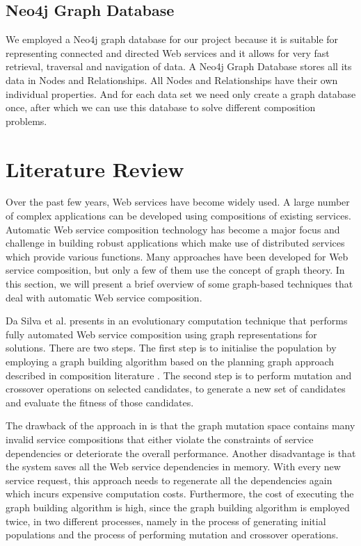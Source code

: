 \subsection{Neo4j Graph Database}
We employed a Neo4j \cite{6} graph database for our project because it is suitable for representing connected and directed Web services and it allows for very fast retrieval, traversal and navigation of data. A Neo4j Graph Database stores all its data in Nodes and Relationships. All Nodes and Relationships have their own individual properties. And for each data set we need only create a graph database once, after which we can use this database to solve different composition problems. \par

\section{Literature Review}
Over the past few years, Web services have become widely used. A large number of complex applications can be developed using compositions of existing services. Automatic Web service composition technology has become a major focus and challenge in building robust applications which make use of distributed services which provide various functions. Many approaches have been developed for Web service composition, but only a few of them use the concept of graph theory. In this section, we will present a brief overview of some graph-based techniques that deal with automatic Web service composition.\par
Da Silva et al. presents in \cite{2} an evolutionary computation technique that performs fully automated Web service composition using graph representations for solutions. There are two steps. The first step is to initialise the population by employing a graph building algorithm based on the planning graph approach described in composition literature \cite{3}. The second step is to perform mutation and crossover operations on selected candidates, to generate a new set of candidates and evaluate the fitness of those candidates.\par
The drawback of the approach in \cite{2} is that the graph mutation space contains many invalid service compositions that either violate the constraints of service dependencies or deteriorate the overall performance. Another disadvantage is that the system saves all the Web service dependencies in memory. With every new service request, this approach needs to regenerate all the dependencies again which incurs expensive computation costs. Furthermore, the cost of executing the graph building algorithm is high, since the graph building algorithm is employed twice, in two different processes, namely in the process of generating initial populations and the process of performing mutation and crossover operations.\par
